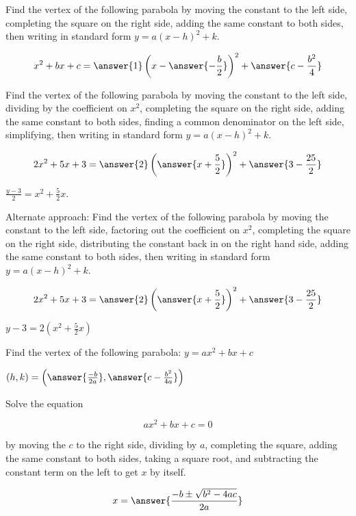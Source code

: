 \documentclass[number]{ximera}
\begin{document}
\begin{question}
Find the vertex of the following parabola by moving the constant to the left side, completing the square on the right side, adding the same constant to both sides, then writing in standard form $y = a(x-h)^2 + k$.

$$x^2 + bx + c = \answer{1}\left(x-\answer{-\frac{b}{2}}\right)^2 + \answer{c-\frac{b^2}{4}}$$
\end{question}

\begin{question}
Find the vertex of the following parabola by moving the constant to the left side, dividing by the coefficient on $x^2$, completing the square on the right side, adding the same constant to both sides, finding a common denominator on the left side, simplifying, then writing in standard form $y = a(x-h)^2 + k$.

$$2x^2 + 5x + 3 = \answer{2}\left(\answer{x+\frac{5}{2}}\right)^2+\answer{3-\frac{25}{2}}$$

\begin{hint}
$\frac{y-3}{2} = x^2 +\frac{5}{2}x$.
\end{hint}

\end{question}

\begin{question}
Alternate approach: Find the vertex of the following parabola by moving the constant to the left side, factoring out the coefficient on $x^2$, completing the square on the right side, distributing the constant back in on the right hand side, adding the same constant to both sides, then writing in standard form $y = a(x-h)^2 + k$.

$$2x^2 + 5x + 3 = \answer{2}\left(\answer{x+\frac{5}{2}}\right)^2+\answer{3-\frac{25}{2}}$$

\begin{hint}
$y-3 = 2(x^2+\frac{5}{2}x)$
\end{hint}
\end{question}

\begin{problem}
Find the vertex of the following parabola: $y = ax^2 + bx + c$

$(h,k) = \left(\answer{\frac{-b}{2a}},\answer{c-\frac{b^2}{4a}}\right)$
\end{problem}

\begin{problem}
 Solve the equation

\[ ax^2 + bx + c = 0 \]

by moving the $c$ to the right side, dividing by $a$, completing the square, adding the same constant to both sides, taking a square root, and subtracting the constant term on the left to get $x$ by itself.

\[x=\answer{\frac{-b\pm\sqrt{b^2-4ac}}{2a}}\]
\end{problem}
\end{document}
